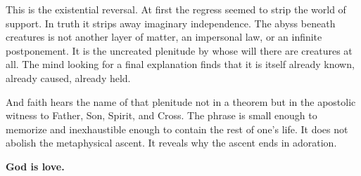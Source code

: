 This is the existential reversal. At first the regress seemed to strip the world of support. In truth it strips away imaginary independence. The abyss beneath creatures is not another layer of matter, an impersonal law, or an infinite postponement. It is the uncreated plenitude by whose will there are creatures at all. The mind looking for a final explanation finds that it is itself already known, already caused, already held.

And faith hears the name of that plenitude not in a theorem but in the apostolic witness to Father, Son, Spirit, and Cross. The phrase is small enough to memorize and inexhaustible enough to contain the rest of one's life. It does not abolish the metaphysical ascent. It reveals why the ascent ends in adoration.

\vspace{1.2\baselineskip}
\begin{center}
{\Large\bfseries God is love.}
\end{center}
